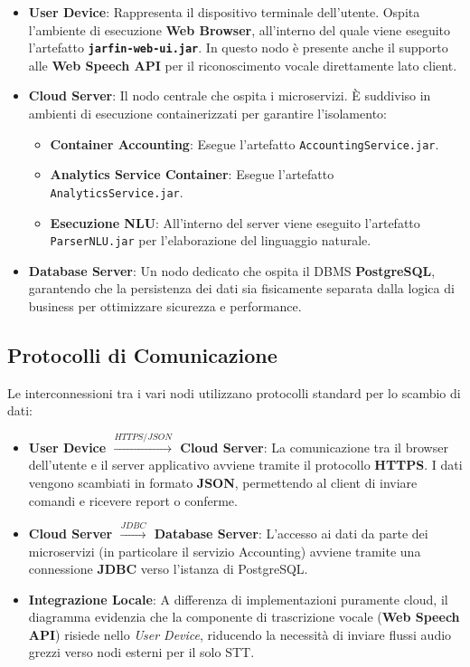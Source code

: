 \begin{itemize}
    \item \textbf{User Device}: Rappresenta il dispositivo terminale dell'utente. Ospita l'ambiente di esecuzione \textbf{Web Browser}, all'interno del quale viene eseguito l'artefatto \textbf{\texttt{jarfin-web-ui.jar}}. In questo nodo è presente anche il supporto alle \textbf{Web Speech API} per il riconoscimento vocale direttamente lato client.

    \newpage
    \item \textbf{Cloud Server}: Il nodo centrale che ospita i microservizi. È suddiviso in ambienti di esecuzione containerizzati per garantire l'isolamento:
          \begin{itemize}
              \item \textbf{Container Accounting}: Esegue l'artefatto \texttt{AccountingService.jar}.
              \item \textbf{Analytics Service Container}: Esegue l'artefatto \texttt{AnalyticsService.jar}.
              \item \textbf{Esecuzione NLU}: All'interno del server viene eseguito l'artefatto \texttt{ParserNLU.jar} per l'elaborazione del linguaggio naturale.
          \end{itemize}

    \item \textbf{Database Server}: Un nodo dedicato che ospita il DBMS \textbf{PostgreSQL}, garantendo che la persistenza dei dati sia fisicamente separata dalla logica di business per ottimizzare sicurezza e performance.
\end{itemize}

\subsection{Protocolli di Comunicazione}
Le interconnessioni tra i vari nodi utilizzano protocolli standard per lo scambio di dati:

\begin{itemize}
    \item \textbf{User Device $\xrightarrow{HTTPS/JSON}$ Cloud Server}: La comunicazione tra il browser dell'utente e il server applicativo avviene tramite il protocollo \textbf{HTTPS}. I dati vengono scambiati in formato \textbf{JSON}, permettendo al client di inviare comandi e ricevere report o conferme.

    \item \textbf{Cloud Server $\xrightarrow{JDBC}$ Database Server}: L'accesso ai dati da parte dei microservizi (in particolare il servizio Accounting) avviene tramite una connessione \textbf{JDBC} verso l'istanza di PostgreSQL.

    \item \textbf{Integrazione Locale}: A differenza di implementazioni puramente cloud, il diagramma evidenzia che la componente di trascrizione vocale (\textbf{Web Speech API}) risiede nello \textit{User Device}, riducendo la necessità di inviare flussi audio grezzi verso nodi esterni per il solo STT.
\end{itemize}

